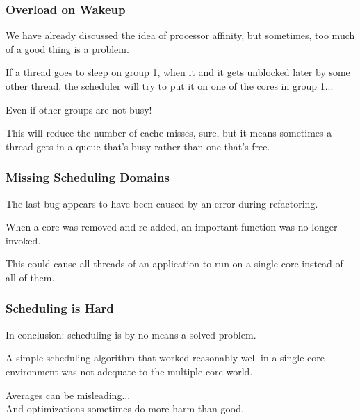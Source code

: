 \begin{frame}
\frametitle{Overload on Wakeup}

We have already discussed the idea of processor affinity, but sometimes, too much of a good thing is a problem. 

If a thread goes to sleep on group 1, when it and it gets unblocked later by some other thread, the scheduler will try to put it on one of the cores in group 1... 

Even if other groups are not busy! 

This will reduce the number of cache misses, sure, but it means sometimes a thread gets in a queue that's busy rather than one that's free.

\end{frame}




\begin{frame}
\frametitle{Missing Scheduling Domains}

The last bug appears to have been caused by an error during refactoring. 

When a core was removed and re-added, an important function was no longer invoked.

This could cause all threads of an application to run on a single core instead of all of them. 

\end{frame}



\begin{frame}
\frametitle{Scheduling is Hard}

In conclusion: scheduling is by no means a solved problem. 

A simple scheduling algorithm that worked reasonably well in a single core environment was not adequate to the multiple core world. 

Averages can be misleading...\\
\quad And optimizations sometimes do more harm than good. 

\end{frame}



